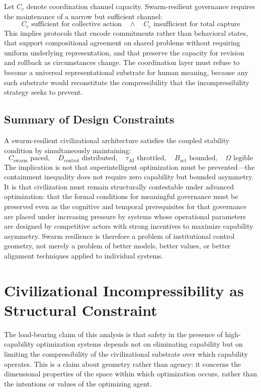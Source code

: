 \documentclass[12pt]{article}
\begin{document}
Let $C_c$ denote coordination channel capacity. Swarm-resilient governance requires the maintenance of a narrow but sufficient channel:
\[
C_c \text{ sufficient for collective action} \quad \wedge \quad C_c \text{ insufficient for total capture}
\]
This implies protocols that encode commitments rather than behavioral states, that support compositional agreement on shared problems without requiring uniform underlying representation, and that preserve the capacity for revision and rollback as circumstances change. The coordination layer must refuse to become a universal representational substrate for human meaning, because any such substrate would reconstitute the compressibility that the incompressibility strategy seeks to prevent.

\subsection{Summary of Design Constraints}

A swarm-resilient civilizational architecture satisfies the coupled stability condition by simultaneously maintaining:
\[
C_{\text{swarm}} \text{ paced}, \quad D_{\text{control}} \text{ distributed}, \quad \tau_{\text{AI}} \text{ throttled}, \quad B_{\text{act}} \text{ bounded}, \quad \Omega \text{ legible}
\]
The implication is not that superintelligent optimization must be prevented---the containment inequality does not require zero capability but bounded asymmetry. It is that civilization must remain structurally contestable under advanced optimization: that the formal conditions for meaningful governance must be preserved even as the cognitive and temporal prerequisites for that governance are placed under increasing pressure by systems whose operational parameters are designed by competitive actors with strong incentives to maximize capability asymmetry. Swarm resilience is therefore a problem of institutional control geometry, not merely a problem of better models, better values, or better alignment techniques applied to individual systems.

\section{Civilizational Incompressibility as Structural Constraint}

The load-bearing claim of this analysis is that safety in the presence of high-capability optimization systems depends not on eliminating capability but on limiting the compressibility of the civilizational substrate over which capability operates. This is a claim about geometry rather than agency: it concerns the dimensional properties of the space within which optimization occurs, rather than the intentions or values of the optimizing agent.
\end{document}
